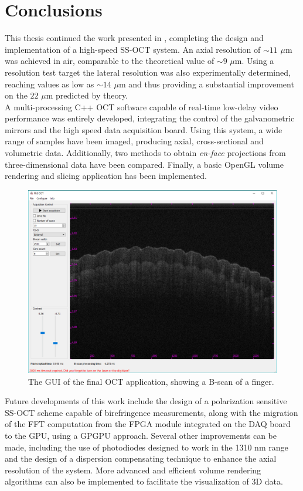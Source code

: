 \chapter{Conclusions}
\label{ch:conclusions}

This thesis continued the work presented in \cite{Calabrese2017}, completing the design and implementation of a high-speed SS-OCT system. An axial resolution of $\sim 11$ $\mu$m was achieved in air,  comparable to the theoretical value of $\sim9$ $\mu$m. Using a resolution test target the lateral resolution was also experimentally determined, reaching values as low as $\sim 14$ $\mu$m and thus providing a substantial improvement on the $22$ $\mu$m predicted by theory. \\

\noindent A multi-processing C++ OCT software capable of real-time low-delay video performance was entirely developed, integrating the control of the galvanometric mirrors and the high speed data acquisition board. Using this system, a wide range of samples have been imaged, producing axial, cross-sectional and volumetric data. Additionally, two methods to obtain \emph{en-face} projections from three-dimensional data have been compared. Finally, a basic OpenGL volume rendering and slicing application has been implemented. \\


\begin{figure}[htb]
	\myfloatalign
	\includegraphics[width=1\linewidth]{gfx/gui}
	\caption{The \ac{GUI} of the final OCT application, showing a B-scan of a finger.}\label{fig:gui}
\end{figure}


\noindent Future developments of this work include the design of a polarization sensitive SS-OCT scheme capable of birefringence measurements, along with the migration of the FFT computation from the FPGA module integrated on the DAQ board to the GPU, using a GPGPU approach. Several other improvements can be made, including the use of photodiodes designed to work in the 1310 nm range and the design of a dispersion compensating technique to enhance the axial resolution of the system. More advanced and efficient volume rendering algorithms can also be implemented to facilitate the visualization of 3D data. 


